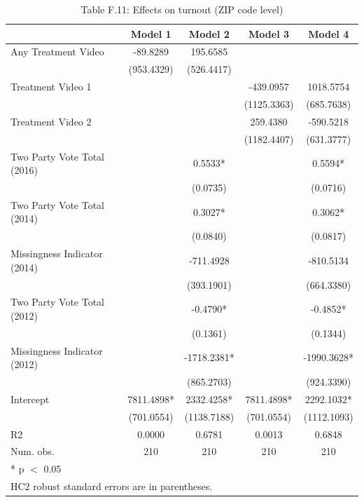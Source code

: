 \begin{table}
\centering
\caption{Table F.11: Effects on turnout (ZIP code level)}
\centering
\begin{tabular}[t]{lcccc}
\toprule
  & Model 1 & Model 2 & Model 3 & Model 4\\
\midrule
Any Treatment Video & -89.8289 & 195.6585 &  & \\
 & (953.4329) & (526.4417) &  & \\
Treatment Video 1 &  &  & -439.0957 & 1018.5754\\
 &  &  & (1125.3363) & (685.7638)\\
Treatment Video 2 &  &  & 259.4380 & -590.5218\\
 &  &  & (1182.4407) & (631.3777)\\
Two Party Vote Total (2016) &  & 0.5533* &  & 0.5594*\\
 &  & (0.0735) &  & (0.0716)\\
Two Party Vote Total (2014) &  & 0.3027* &  & 0.3062*\\
 &  & (0.0840) &  & (0.0817)\\
Missingness Indicator (2014) &  & -711.4928 &  & -810.5134\\
 &  & (393.1901) &  & (664.3380)\\
Two Party Vote Total (2012) &  & -0.4790* &  & -0.4852*\\
 &  & (0.1361) &  & (0.1344)\\
Missingness Indicator (2012) &  & -1718.2381* &  & -1990.3628*\\
 &  & (865.2703) &  & (924.3390)\\
Intercept & 7811.4898* & 2332.4258* & 7811.4898* & 2292.1032*\\
 & (701.0554) & (1138.7188) & (701.0554) & (1112.1093)\\
\midrule
R2 & 0.0000 & 0.6781 & 0.0013 & 0.6848\\
Num. obs. & 210 & 210 & 210 & 210\\
\bottomrule
\multicolumn{5}{l}{\rule{0pt}{1em}* p $<$ 0.05}\\
\multicolumn{5}{l}{\rule{0pt}{1em}HC2 robust standard errors are in parentheses.}\\
\end{tabular}
\end{table}
